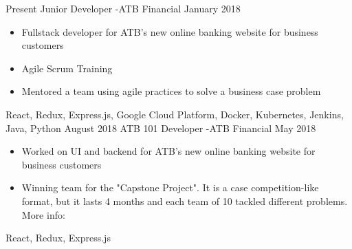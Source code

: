 
\begin{experiences}
  \experience
    {Present}   {Junior Developer -}{ATB Financial}{}
    {January 2018} {
                      \begin{itemize}
                        \item Fullstack developer for ATB's new online banking website for business customers
                        \item Agile Scrum Training
                        \item Mentored a team using agile practices to solve a business case problem
                      \end{itemize}
                    }
                    {
                        React,
                        Redux,
                        Express.js,
                        Google Cloud Platform,
                        Docker,
                        Kubernetes,
                        Jenkins,
                        Java,
                        Python
                    }
  \emptySeparator
  \experience
  {August 2018}   {ATB 101 Developer -}{ATB Financial}{}
  {May 2018} {
                    \begin{itemize}
                      \item Worked on UI and backend for ATB's new online banking website for business customers
                      \item Winning team for the "Capstone Project". It is a case competition-like format,
                      but it lasts 4 months and each team of 10 tackled different problems.
                      More info: 
                    \end{itemize}
                  }
                  {
                      React,
                      Redux,
                      Express.js
                  }
\end{experiences}
